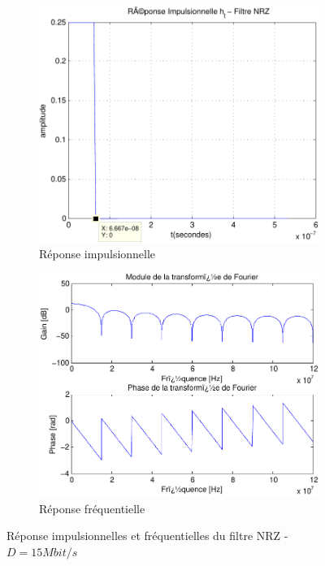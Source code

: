 \documentclass[a4paper,11pt]{article}
\begin{document}
\begin{figure}
	\begin{subfigure}{.5\textwidth}
  		\centering
  		\includegraphics[width=1\linewidth]{impul_nrz_15-crop.pdf}
  		\caption{Réponse impulsionnelle}
  		\label{fig:nrz_impul15M}
	\end{subfigure}
	\begin{subfigure}{.5\textwidth}
  		\centering
  		\includegraphics[width=1\linewidth]{frec_nrz_15-crop.pdf}
  		\caption{Réponse fréquentielle}
  		\label{fig:nrz_frec15M}
	\end{subfigure}%
	\caption{Réponse impulsionnelles et fréquentielles du filtre NRZ - $D=15 Mbit/s$}
	\label{fig:nrz15M}
\end{figure} 
\end{document}
